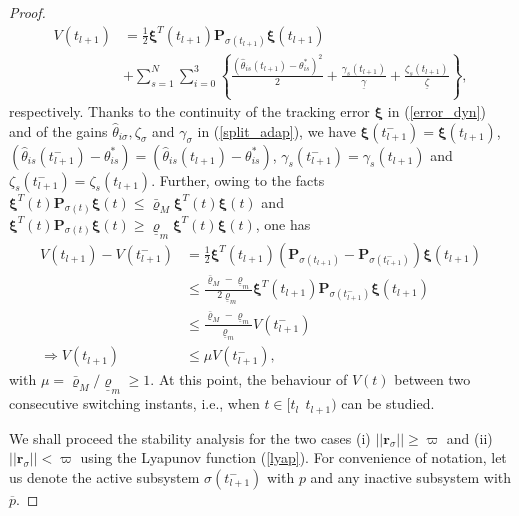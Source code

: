 \documentclass[AMA,STIX1COL,sort, compress]{WileyNJD-v2}
\begin{document}
\begin{proof}
\begin{align*}
	V({t_{l+1}}) &= \frac{1}{2}  \boldsymbol{\xi}^T({t_{l+1}}) \mathbf{P}_{\sigma({t_{l+1}})} \boldsymbol{\xi}({t_{l+1}})  \nonumber\\
	& +  \sum_{s=1}^{N} \sum_{i=0}^{3} \left \lbrace \frac{ (\hat{\theta}_{is}({t_{l+1}}) -{\theta}_{is}^{*})^2}{2} + \frac{ \gamma_{s}({t_{l+1}})}{ \underline{\gamma}}+ \frac{\zeta_{s}({t_{l+1}})}{ \underline{\zeta}} \right \rbrace,
	\end{align*}
	respectively. Thanks to the continuity of the tracking error $\boldsymbol \xi$ in (\ref{error_dyn}) and of the gains $\hat{\theta}_{i\sigma},\zeta_\sigma$ and $\gamma_{\sigma}$ in (\ref{split_adap}), we have $\boldsymbol \xi({t_{l+1}^{-}}) = \boldsymbol \xi ({t_{l+1}})$, $(\hat{\theta}_{is}({t_{l+1}^{-}}) -{\theta}_{is}^{*})=(\hat{\theta}_{is}({t_{l+1}}) -{\theta}_{is}^{*})$, $\gamma_{s}({t_{l+1}^{-}}) = \gamma_{s}({t_{l+1}})$ and $\zeta_{s}({t_{l+1}^{-}}) = \zeta_{s}({t_{l+1}})$. Further, owing to the facts $ \boldsymbol{\xi}^T({t}) \mathbf{P}_{\sigma(t)} \boldsymbol{\xi}({t}) \leq {\bar{\varrho}_M} \boldsymbol{\xi}^T({t}) \boldsymbol{\xi}({t})$ and $ \boldsymbol{\xi}^T({t}) \mathbf{P}_{\sigma(t)} \boldsymbol{\xi}({t}) \geq {\underline{\varrho}_m}  \boldsymbol{\xi}^T({t}) \boldsymbol{\xi}({t})$, one has 
	\begin{align}
	 V({t_{l+1}}) - V({t_{l+1}^{-}})  &=  \frac{1}{2} \boldsymbol{\xi}^T({t_{l+1}}) ( \mathbf{P}_{\sigma({t_{l+1}})} -  \mathbf{P}_{\sigma({t_{l+1}^{-}})} ) \boldsymbol{\xi}({t_{l+1}}) \nonumber\\
	&\leq  \frac{{\bar{\varrho}_M} - {\underline{\varrho}_m} }{{2\underline{\varrho}_m} }  \boldsymbol{\xi}^T({t_{l+1}}) \mathbf{P}_{\sigma({t_{l+1}^{-}})} \boldsymbol{\xi}({t_{l+1}})  \nonumber\\
	&\leq \frac{{\bar{\varrho}_M} - {\underline{\varrho}_m} }{{\underline{\varrho}_m} } V(t_{l+1}^{-}) \nonumber \\
 \Rightarrow V({t_{l+1}})  &\leq \mu V(t_{l+1}^{-}), \label{mu}
	\end{align}
	with $\mu = {\bar{\varrho}_M} / {\underline{\varrho}_m} \geq 1$. At this point, the behaviour of $V(t)$ between two consecutive switching instants, i.e., when $t \in [t_l~~t_{l+1})$ can be studied. 
	
	We shall proceed the stability analysis for the two cases (i) $|| \mathbf{r}_\sigma || \geq \varpi$ and (ii) $|| \mathbf{r}_\sigma || < \varpi$ using the Lyapunov function (\ref{lyap}). For convenience of notation, let us denote the active subsystem ${\sigma({t_{l+1}^{-}})}$ with $p$ and any inactive subsystem with $\overline{p}$.
	

\end{proof}
\end{document}
